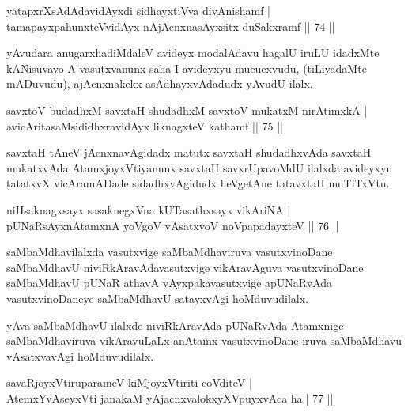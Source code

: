 
\begin{shl}
yatapxrXsAdAdavidAyxdi sidhayxtiVva divAnishamf |  \\
tamapayxpahunxteV\s vidAyx nAjAcnxnasAyxsitx duSakxramf \hfill||  74 ||  
\end{shl}

\begin{artha}
yAvudara anugarxhadiMdaleV avideyx modalAdavu hagalU iruLU idadxMte kANisuvavo A vasutxvanunx saha I avideyxyu mucucxvudu, (tiLiyadaMte mADuvudu), ajAcnxnakekx asAdhayxvAdadudx yAvudU ilalx.
\end{artha}

\begin{shl}
savxtoV budadhxM savxtaH shudadhxM savxtoV mukatxM nirAtimxkA | \\
avicAritasaMsididhxravidAyx liknagxteV kathamf \hfill||  75 ||  
\end{shl}

\begin{artha}
savxtaH tAneV jAcnxnavAgidadx matutx savxtaH shudadhxvAda savxtaH mukatxvAda AtamxjoyxVtiyanunx savxtaH savxrUpavoMdU ilalxda avideyxyu tatatxvX vicAramADade sidadhxvAgidudx heVgetAne tatavxtaH muTiTxVtu.
\end{artha}

\begin{shl}
niHsaknagxsayx sasaknegxVna kUTasathxsayx vikAriNA |  \\
pUNaRsAyxnAtamxnA yoVgoV vAsatxvoV noVpapadayxteV \hfill||  76 ||  
\end{shl}

\begin{artha}
saMbaMdhavilalxda vasutxvige saMbaMdhaviruva vasutxvinoDane saMbaMdhavU niviRkAravAdavasutxvige vikAravAguva vasutxvinoDane saMbaMdhavU pUNaR athavA vAyxpakavasutxvige apUNaRvAda vasutxvinoDaneye saMbaMdhavU satayxvAgi hoMduvudilalx.

yAva saMbaMdhavU ilalxde niviRkAravAda pUNaRvAda Atamxnige saMbaMdhaviruva vikAravuLaLx anAtamx vasutxvinoDane iruva saMbaMdhavu vAsatxvavAgi hoMduvudilalx.
\end{artha}

\begin{shl}
savaRjoyxVtiruparameV kiMjoyxVtiriti coVditeV |  \\
AtemxYvAseyxVti janakaM yAjacnxvalokxyXV\s puyxvAca ha\hfill ||  77 ||  
\end{shl}

